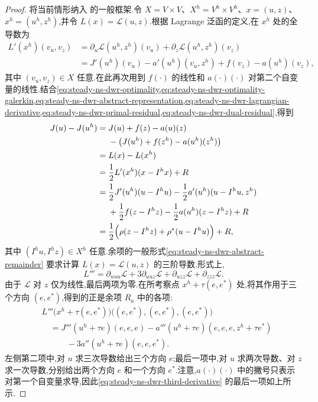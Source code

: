 \begin{proof}
将当前情形纳入 的一般框架.令 $X=V\times V$、$X^h=V^h\times V^h$、$x=(u,z)$、$x^h=(u^h,z^h)$,并令 $L(x)=\mathcal{L}(u,z)$.根据 Lagrange 泛函的定义,在 $x^h$ 处的全导数为
\begin{equation}\label{eq:steady-ns-dwr-lagrangian-derivative}
\begin{aligned}
  L'(x^h)(v_u,v_z)
   &=\partial_u\mathcal{L}(u^h,z^h)(v_u)
     +\partial_z\mathcal{L}(u^h,z^h)(v_z)\\
   &=J'(u^h)(v_u)-a'(u^h)(v_u,z^h)
     +f(v_z)-a(u^h)(v_z),
\end{aligned}
\end{equation}
其中 $(v_u,v_z)\in X$ 任意.在此再次用到 $f(\cdot)$ 的线性和 $a(\cdot)(\cdot)$ 对第二个自变量的线性.结合\cref{eq:steady-ns-dwr-optimality,eq:steady-ns-dwr-optimality-galerkin,eq:steady-ns-dwr-abstract-representation,eq:steady-ns-dwr-lagrangian-derivative,eq:steady-ns-dwr-primal-residual,eq:steady-ns-dwr-dual-residual},得到
\[
\begin{aligned}
  J(u)-J(u^h)
   ={}&J(u)+f(z)-a(u)(z)\\
     &-\bigl(J(u^h)+f(z^h)-a(u^h)(z^h)\bigr)\\
   ={}&L(x)-L(x^h)\\
   ={}&\frac12L'(x^h)(x-I^h x)+R\\
   ={}&\frac12J'(u^h)(u-I^h u)
       -\frac12a'(u^h)(u-I^h u,z^h)\\
     &+\frac12f(z-I^h z)
       -\frac12a(u^h)(z-I^h z)+R\\
   ={}&\frac12\Bigl(\rho(z-I^h z)+\rho^*(u-I^h u)\Bigr)+R,
\end{aligned}
\]
其中 $(I^h u,I^h z)\in X^h$ 任意.余项的一般形式\cref{eq:steady-ns-dwr-abstract-remainder} 要求计算 $L(x)=\mathcal{L}(u,z)$ 的三阶导数.形式上,
\[
  L'''=\partial_{uuu}\mathcal{L}
      +3\partial_{uuz}\mathcal{L}
      +\partial_{uzz}\mathcal{L}
      +\partial_{zzz}\mathcal{L}.
\]
由于 $\mathcal{L}$ 对 $z$ 仅为线性,最后两项为零.在所考察点 $x^h+\tau(e,e^*)$ 处,将其作用于三个方向 $(e,e^*)$,得到的正是余项 $R_a$ 中的各项:
\begin{equation}\label{eq:steady-ns-dwr-third-derivative}
\begin{aligned}
  &L'''\bigl(x^h+\tau(e,e^*)\bigr)
       \bigl((e,e^*),(e,e^*),(e,e^*)\bigr)\\
  &\quad=J'''(u^h+\tau e)(e,e,e)
       -a'''(u^h+\tau e)(e,e,e,z^h+\tau e^*)\\
  &\qquad\quad-3a''(u^h+\tau e)(e,e,e^*).
\end{aligned}
\end{equation}
左侧第二项中,对 $u$ 求三次导数给出三个方向 $e$;最后一项中,对 $u$ 求两次导数、对 $z$ 求一次导数,分别给出两个方向 $e$ 和一个方向 $e^*$.注意,$a(\cdot)(\cdot)$ 中的撇号只表示对第一个自变量求导,因此\cref{eq:steady-ns-dwr-third-derivative} 的最后一项如上所示.
\end{proof}

